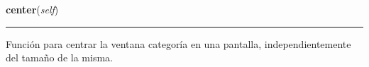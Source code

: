     \label{categoria:Categoria:center}

    \vspace{0.5ex}

\hspace{.8\funcindent}\begin{boxedminipage}{\funcwidth}

    \raggedright \textbf{center}(\textit{self})

    \vspace{-1.5ex}

    \rule{\textwidth}{0.5\fboxrule}
\setlength{\parskip}{2ex}
    Función para centrar la ventana categoría en una pantalla, 
    independientemente del tamaño de la misma.

\setlength{\parskip}{1ex}
    \end{boxedminipage}

